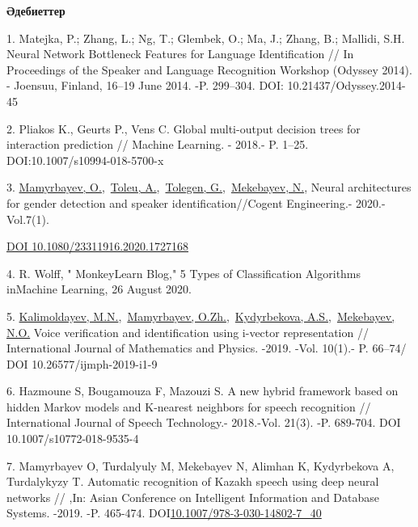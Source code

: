 \begin{center}
{\bfseries Әдебиеттер}
\end{center}

\begin{references}
1. Matejka, P.; Zhang, L.; Ng, T.; Glembek, O.; Ma, J.; Zhang, B.;
Mallidi, S.H. Neural Network Bottleneck Features for Language
Identification // In Proceedings of the Speaker and Language
Recognition Workshop (Odyssey 2014). - Joensuu, Finland, 16--19 June
2014. -P. 299--304. DOI: 10.21437/Odyssey.2014-45

2. Pliakos K., Geurts P., Vens C. Global multi-output decision trees for
interaction prediction // Machine Learning. - 2018.- P. 1--25.
DOI:10.1007/s10994-018-5700-x

3. \href{https://www.scopus.com/authid/detail.uri?authorId=55967630400}{Mamyrbayev,
O.},~\href{https://www.scopus.com/authid/detail.uri?authorId=57200275502}{Toleu,
A.},~\href{https://www.scopus.com/authid/detail.uri?authorId=57200276217}{Tolegen,
G.},~\href{https://www.scopus.com/authid/detail.uri?authorId=57202316868}{Mekebayev,
N.}, Neural architectures for gender detection and speaker
identification//Cogent Engineering.- 2020.-Vol.7(1).

\href{https://doi.org/10.1080/23311916.2020.1727168}{DOI
10.1080/23311916.2020.1727168}

4. R. Wolff, " MonkeyLearn Blog," 5 Types of Classification Algorithms
inMachine Learning, 26 August 2020.

5. \href{https://www.scopus.com/authid/detail.uri?authorId=56153126500}{Kalimoldayev,
M.N.},~\href{https://www.scopus.com/authid/detail.uri?authorId=55967630400}{Mamyrbayev,
O.Zh.},~\href{https://www.scopus.com/authid/detail.uri?authorId=57208346238}{Kydyrbekova,
A.S.},~\href{https://www.scopus.com/authid/detail.uri?authorId=57202316868}{Mekebayev,
N.O.} Voice verification and identification using i-vector
representation // International Journal of Mathematics and Physics.
-2019. -Vol. 10(1).- P. 66--74/ DOI 10.26577/ijmph-2019-i1-9

6. Hazmoune S, Bougamouza F, Mazouzi S. A new hybrid framework based on
hidden Markov models and K-nearest neighbors for speech recognition //
International Journal of Speech Technology.- 2018.-Vol. 21(3). -P.
689-704. DOI 10.1007/s10772-018-9535-4

7. Mamyrbayev O, Turdalyuly M, Mekebayev N, Alimhan K, Kydyrbekova A,
Turdalykyzy T. Automatic recognition of Kazakh speech using deep
neural networks // ,In: Asian Conference on Intelligent Information
and Database Systems. -2019. -P. 465-474.
DOI\href{http://dx.doi.org/10.1007/978-3-030-14802-7_40}{10.1007/978-3-030-14802-7\_40}


\end{references}
